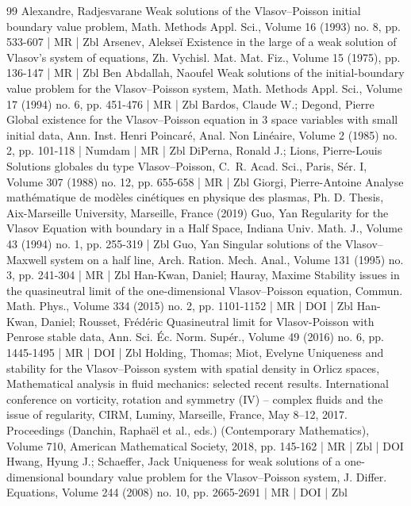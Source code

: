 \documentclass[10pt]{amsart}
\theoremstyle{definition}\newtheorem{defi}[theo]{Definition}\newtheorem{rema}[theo]{Remark}\newtheorem{exam}[theo]{Example}\newtheorem{exem}[theo]{Example}\newtheorem{nota}[theo]{Notation}
\begin{document}
\begin{thebibliography}{99}
Alexandre, Radjesvarane Weak solutions of the Vlasov–Poisson initial boundary value problem, Math. Methods Appl. Sci., Volume 16 (1993) no. 8, pp. 533-607 | MR | Zbl
Arsenev, Alekseĭ Existence in the large of a weak solution of Vlasov’s system of equations, Zh. Vychisl. Mat. Mat. Fiz., Volume 15 (1975), pp. 136-147 | MR | Zbl
Ben Abdallah, Naoufel Weak solutions of the initial-boundary value problem for the Vlasov–Poisson system, Math. Methods Appl. Sci., Volume 17 (1994) no. 6, pp. 451-476 | MR | Zbl
Bardos, Claude W.; Degond, Pierre Global existence for the Vlasov–Poisson equation in 3 space variables with small initial data, Ann. Inst. Henri Poincaré, Anal. Non Linéaire, Volume 2 (1985) no. 2, pp. 101-118 | Numdam | MR | Zbl
DiPerna, Ronald J.; Lions, Pierre-Louis Solutions globales du type Vlasov–Poisson, C. R. Acad. Sci., Paris, Sér. I, Volume 307 (1988) no. 12, pp. 655-658 | MR | Zbl
Giorgi, Pierre-Antoine Analyse mathématique de modèles cinétiques en physique des plasmas, Ph. D. Thesis, Aix-Marseille University, Marseille, France (2019)
Guo, Yan Regularity for the Vlasov Equation with boundary in a Half Space, Indiana Univ. Math. J., Volume 43 (1994) no. 1, pp. 255-319 | Zbl
Guo, Yan Singular solutions of the Vlasov–Maxwell system on a half line, Arch. Ration. Mech. Anal., Volume 131 (1995) no. 3, pp. 241-304 | MR | Zbl
Han-Kwan, Daniel; Hauray, Maxime Stability issues in the quasineutral limit of the one-dimensional Vlasov–Poisson equation, Commun. Math. Phys., Volume 334 (2015) no. 2, pp. 1101-1152 | MR | DOI | Zbl
Han-Kwan, Daniel; Rousset, Frédéric Quasineutral limit for Vlasov-Poisson with Penrose stable data, Ann. Sci. Éc. Norm. Supér., Volume 49 (2016) no. 6, pp. 1445-1495 | MR | DOI | Zbl
Holding, Thomas; Miot, Evelyne Uniqueness and stability for the Vlasov–Poisson system with spatial density in Orlicz spaces, Mathematical analysis in fluid mechanics: selected recent results. International conference on vorticity, rotation and symmetry (IV) – complex fluids and the issue of regularity, CIRM, Luminy, Marseille, France, May 8–12, 2017. Proceedings (Danchin, Raphaël et al., eds.) (Contemporary Mathematics), Volume 710, American Mathematical Society, 2018, pp. 145-162 | MR | Zbl | DOI
Hwang, Hyung J.; Schaeffer, Jack Uniqueness for weak solutions of a one-dimensional boundary value problem for the Vlasov–Poisson system, J. Differ. Equations, Volume 244 (2008) no. 10, pp. 2665-2691 | MR | DOI | Zbl

\end{thebibliography}
\end{document}
